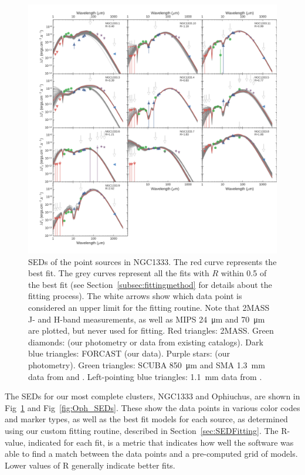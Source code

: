 \begin{figure}[!h]
\begin{center}
\includegraphics[width=\textwidth]{Figures/NGC1333_SEDs.png}
\caption[NGC1333 SEDs]{SEDs of the point sources in NGC1333. The red curve represents the best fit. The grey curves represent all the fits with $R$ within 0.5 of the best fit (see Section~\ref{subsec:fittingmethod} for details about the fitting process). The white arrows show which data point is considered an upper limit for the fitting routine. Note that 2MASS J- and H-band measurements, as well as \Spitzer MIPS \SI{24}{\um} and \SI{70}{\um} are plotted, but never used for fitting. Red triangles: 2MASS. Green diamonds: \Spitzer (our photometry or data from existing catalogs). Dark blue triangles: FORCAST (our data). Purple stars: \Herschel (our photometry). Green triangles: SCUBA \SI{850}{\um} and SMA \SI{1.3}{\milli\meter} data from \citep{vanKempen:2009ku} and \citep{vanKempen:2012fb}. Left-pointing blue triangles: \SI{1.1}{\milli\meter} data from \citet{Enoch:2009ch}.}
\label{fig:NGC1333_SEDs}
\end{center}
\end{figure}

The SEDs for our most complete clusters, NGC1333 and Ophiuchus, are shown in Fig~\ref{fig:NGC1333_SEDs} and Fig~\ref{fig:Oph_SEDs}. These show the data points in various color codes and marker types, as well as the best fit models for each source, as determined using our custom fitting routine, described in Section~\ref{sec:SEDFitting}. The R-value, indicated for each fit, is a metric that indicates how well the software was able to find a match between the data points and a pre-computed grid of models. Lower values of R generally indicate better fits.

